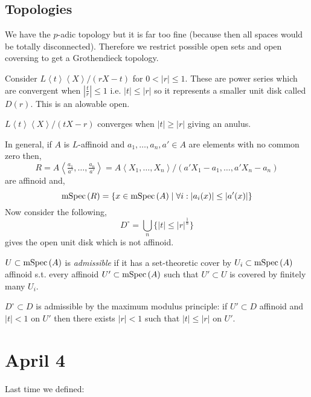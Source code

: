 \documentclass[12pt]{article}
\begin{document}
\subsection{Topologies}

We have the $p$-adic topology but it is far too fine (because then all spaces would be totally disconnected). Therefore we restrict possible open sets and open coversing to get a Grothendieck topology. 

\begin{example}
Consider $L \left< t \right> \left< X \right> /(r X - t)$ for $0 < |r| \le 1$. These are power series which are convergent when $\left| \frac{t}{r} \right| \le 1$ i.e. $|t| \le |r|$ so it represents a smaller unit disk called $D(r)$. This is an alowable open. 
\end{example}

\begin{example}
$L\left< t \right> \left< X \right> /(t X - r)$ converges when $|t| \ge |r|$ giving an anulus.
\end{example}

In general, if $A$ is $L$-affinoid and $a_1, \dots, a_n, a' \in A$ are elements with no common zero then,
\[ R =  A \left< \tfrac{a_1}{a'}, \dots, \tfrac{a_n}{a'} \right> = A \left< X_1, \dots, X_n \right> / (a' X_1 - a_1, \dots, a' X_n - a_n) \]
are affinoid and,
\[ \mathrm{mSpec}\left( R \right) = \{ x \in \mathrm{mSpec}\left( A \right) \mid \forall i : |a_i(x)| \le | a'(x) | \} \]
Now consider the following,
\[ D^\circ = \bigcup_n \{ |t| \le |r|^{\frac{1}{n}} \} \]
gives the open unit disk which is not affinoid.

\begin{defn}
$U \subset \mathrm{mSpec}\left( A \right)$ is \textit{admissible} if it has a set-theoretic cover by $U_i \subset \mathrm{mSpec}\left( A \right)$ affinoid s.t. every affinoid $U' \subset \mathrm{mSpec}\left( A \right)$ such that $U' \subset U$ is covered by finitely many $U_i$. 
\end{defn}

\begin{rmk}
$D^\circ \subset D$ is admissible by the maximum modulus principle: if $U' \subset D$ affinoid and $|t| < 1$ on $U'$ then there exists $|r| < 1$ such that $|t| \le |r|$ on $U'$.
\end{rmk}

\section{April 4}

Last time we defined:
\end{document}
